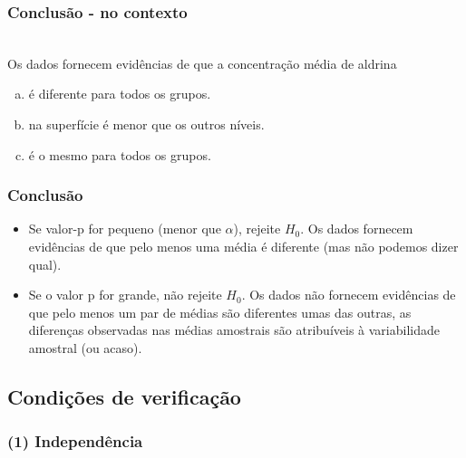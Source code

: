
\begin{frame}
\frametitle{Conclusão - no contexto}
\justifying
{}

$\:$ \\
\justifying
Os dados fornecem evidências de que a concentração média de aldrina
\begin{enumerate}[(a)]
\justifying
\item  é diferente para todos os grupos.
\justifying
\item na superfície é menor que os outros níveis.
\justifying
{}
\justifying
\item é o mesmo para todos os grupos.

\end{enumerate}

\end{frame}


\begin{frame}
\frametitle{Conclusão}

\begin{itemize}
\justifying
\item  Se valor-p for pequeno (menor que $\alpha$), rejeite $H_0$. Os dados fornecem evidências de que pelo menos uma média é diferente (mas não podemos dizer qual).

\pause
\justifying
\item Se o valor p for grande, não rejeite $H_0$. Os dados não fornecem evidências de que pelo menos um par de médias são diferentes umas das outras, as diferenças observadas nas médias amostrais são atribuíveis à variabilidade amostral (ou acaso).

\end{itemize}

\end{frame}


\subsection{Condições de verificação}


\begin{frame}[fragile]
\frametitle{(1) Independência}
\justifying
{}
\justifying
{}

\end{frame}

